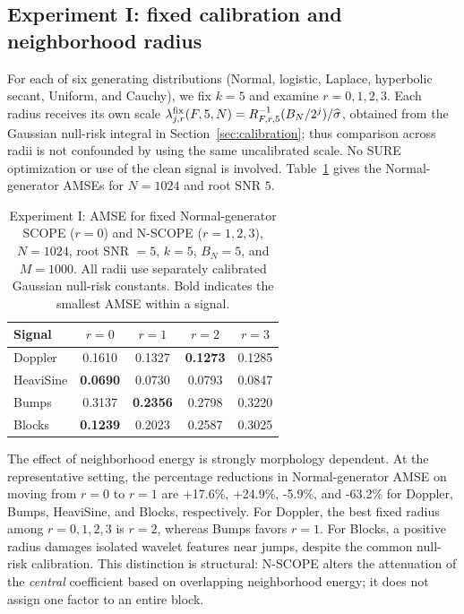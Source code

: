 \subsection{Experiment I: fixed calibration and neighborhood radius}
\label{sec:simul-fixed}

For each of six generating distributions (Normal, logistic, Laplace,
hyperbolic secant, Uniform, and Cauchy), we fix $k=5$ and examine
$r=0,1,2,3$. Each radius receives its own scale
$\lambda_{j,r}^{\rm fix}(F,5,N)=
R_{F,r,5}^{-1}(B_N/2^j)/\widehat\sigma$, obtained from the
Gaussian null-risk integral in Section~\ref{sec:calibration}; thus
comparison across radii is not confounded by using the same uncalibrated
scale. No SURE optimization or use of the clean signal is involved.
Table~\ref{tab:e1-normal} gives the Normal-generator AMSEs for
$N=1024$ and root SNR $5$.

\begin{table}[tbp]
\centering\small
\caption{Experiment I: AMSE for fixed Normal-generator SCOPE ($r=0$) and N-SCOPE ($r=1,2,3$), $N=1024$, root SNR $=5$, $k=5$, $B_N=5$, and $M=1000$. All radii use separately calibrated Gaussian null-risk constants. Bold indicates the smallest AMSE within a signal.}
\label{tab:e1-normal}
\setlength{\tabcolsep}{5pt}
\begin{tabular}{lcccc}
\toprule
Signal & $r=0$ & $r=1$ & $r=2$ & $r=3$ \\
\midrule
Doppler & 0.1610 & 0.1327 & \textbf{0.1273} & 0.1285 \\
HeaviSine & \textbf{0.0690} & 0.0730 & 0.0793 & 0.0847 \\
Bumps & 0.3137 & \textbf{0.2356} & 0.2798 & 0.3220 \\
Blocks & \textbf{0.1239} & 0.2023 & 0.2587 & 0.3025 \\
\bottomrule
\end{tabular}
\end{table}

The effect of neighborhood energy is strongly morphology dependent.
At the representative setting, the percentage reductions in
Normal-generator AMSE on moving from $r=0$ to $r=1$ are
+17.6\%, +24.9\%, -5.9\%, and -63.2\%
for Doppler, Bumps, HeaviSine, and Blocks, respectively. For Doppler, the best fixed radius among
$r=0,1,2,3$ is $r=2$, whereas Bumps favors $r=1$.
For Blocks, a positive radius damages isolated wavelet features near
jumps, despite the common null-risk calibration. This distinction is
structural: N-SCOPE alters the attenuation of the \emph{central}
coefficient based on overlapping neighborhood energy; it does not
assign one factor to an entire block.

